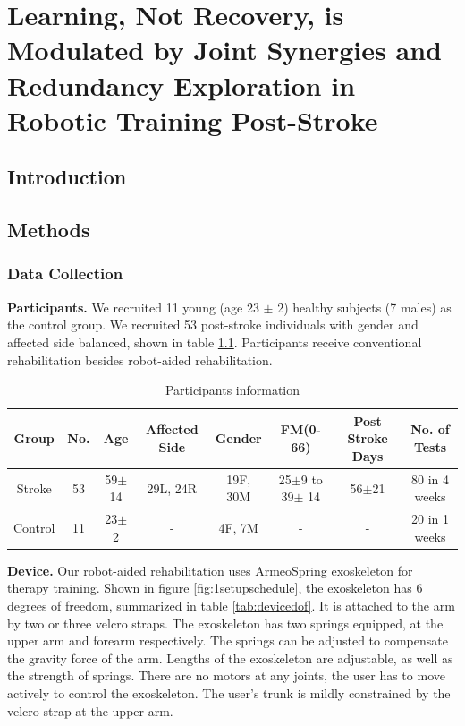 \chapter{Learning, Not Recovery, is Modulated by Joint Synergies and Redundancy Exploration in Robotic Training Post-Stroke}
\label{cha:armeospring}



\section{Introduction}



\section{Methods}

\subsection{Data Collection}

\textbf{Participants.} 
We recruited 11 young (age 23 $\pm$ 2) healthy subjects (7 males) as the control group.
We recruited 53 post-stroke individuals with gender and affected side balanced, shown in table \ref{tab:demog}. 
Participants receive conventional rehabilitation besides robot-aided rehabilitation.

\begin{table}[b]
	\begin{tabular}{c c c c c c c c}
		\hline
		Group & No. & Age & Affected Side & Gender & FM(0-66) & Post Stroke Days & No. of Tests\\
		\hline
		Stroke & 53 & 59$\pm$14 & 29L, 24R & 19F, 30M & 25$\pm$9 to 39$\pm$ 14 & 56$\pm$21 & 80 in 4 weeks \\ 
		Control & 11 & 23$\pm$2 & - & 4F, 7M & - & - & 20 in 1 weeks \\
		\hline
	\end{tabular}
	\caption{Participants information}
	\label{tab:demog}
\end{table}

\textbf{Device.}
Our robot-aided rehabilitation uses ArmeoSpring exoskeleton \cite{} for therapy training. 
Shown in figure \ref{fig:1setupschedule}, the exoskeleton has 6 degrees of freedom, summarized in table \ref{tab:devicedof}. 
It is attached to the arm by two or three velcro straps. 
The exoskeleton has two springs equipped, at the upper arm and forearm respectively. 
The springs can be adjusted to compensate the gravity force of the arm. 
Lengths of the exoskeleton are adjustable, as well as the strength of springs. 
There are no motors at any joints, the user has to move actively to control the exoskeleton. 
The user's trunk is mildly constrained by the velcro strap at the upper arm.  


